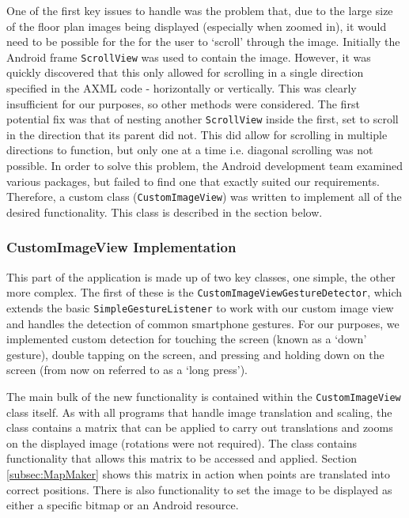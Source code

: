 \documentclass[main.tex]{subfiles}
\begin{document}
            One of the first key issues to handle was the problem that, due to the large size of the floor plan images being displayed (especially when zoomed in), it would need
            to be possible for the for the user to `scroll' through the image. Initially the Android frame \texttt{ScrollView} was used to contain the image. However, it was quickly
            discovered that this only allowed for scrolling in a single direction specified in the AXML code - horizontally or vertically.
            This was clearly insufficient for our purposes, so other methods
            were considered. The first potential fix was that of nesting another \texttt{ScrollView} inside the first, set to scroll in the direction that its parent did not.
            This did allow for scrolling in multiple directions to function, but only one at a time i.e. diagonal scrolling was not possible. In order to solve this problem,
            the Android development team examined various packages, but failed to find one that exactly suited our requirements. Therefore, a custom class
            (\texttt{CustomImageView}) was written to implement all of the desired functionality. This class is described in the section below.
            \subsubsection*{CustomImageView Implementation}
                This part of the application is made up of two key classes, one simple, the other more complex. The first of these is the \texttt{CustomImageViewGestureDetector},
                which extends the basic \texttt{SimpleGestureListener} to work with our custom image view and handles the detection of common smartphone gestures. For our purposes,
                we implemented custom detection for touching the screen (known as a `down' gesture), double tapping on the screen, and pressing and holding down on the screen
                (from now on referred to as a `long press').
                
                The main bulk of the new functionality is contained within the \texttt{CustomImageView} class itself. As with all programs that handle image translation and scaling,
                the class contains a matrix that can be applied to carry out translations and zooms on the displayed image (rotations were not required). The class contains functionality
                that allows this matrix to be accessed and applied. Section \ref{subsec:MapMaker} shows this matrix in action when points are translated into correct positions.
                There is also functionality to set the image to be displayed as either a specific bitmap or an Android resource.
                
\end{document}
